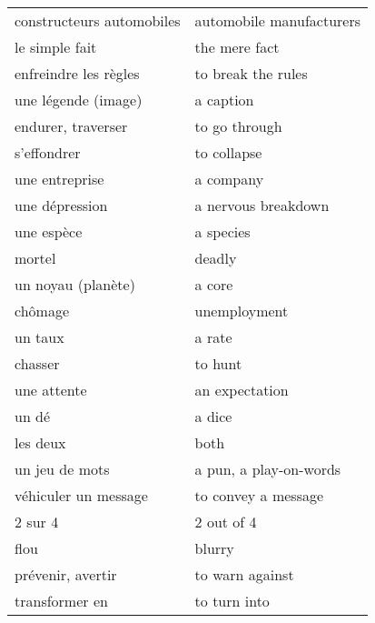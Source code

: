 \documentclass[
  10pt,
]{article}
\begin{document}
\begin{longtable}{ll}
constructeurs automobiles & automobile manufacturers\\

\rowcolor{gray!6}  le simple fait & the mere fact\\

enfreindre les règles & to break the rules\\

\rowcolor{gray!6}  une légende (image) & a caption\\

endurer, traverser & to go through\\

\rowcolor{gray!6}  s'effondrer & to collapse\\

une entreprise & a company\\
\rowcolor{gray!6}  une dépression & a nervous breakdown\\

une espèce & a species\\
\rowcolor{gray!6}  mortel & deadly\\

un noyau (planète) & a core\\

\rowcolor{gray!6}  chômage & unemployment\\

un taux & a rate\\

\rowcolor{gray!6}  chasser & to hunt\\

une attente & an expectation\\

\rowcolor{gray!6}  un dé & a dice\\

les deux & both\\

\rowcolor{gray!6}  un jeu de mots & a pun, a play-on-words\\

véhiculer un message & to convey a message\\

\rowcolor{gray!6}  2 sur 4 & 2 out of 4\\

flou & blurry\\

\rowcolor{gray!6}  prévenir, avertir & to warn against\\

transformer en & to turn into\\


\end{longtable}
\end{document}
